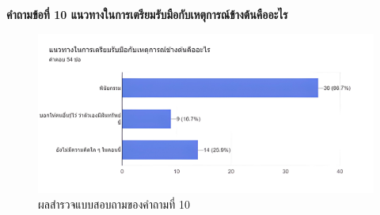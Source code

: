 \documentclass[12pt,oneside,openright,a4paper]{cpe-thai-project}
\begin{document}
\bf คำถามข้อที่ 10 แนวทางในการเตรียมรับมือกับเหตุการณ์ข้างต้นคืออะไร\\
\begin{figure}[h]
			\centering
			\includegraphics[scale=0.1]{apprex10}
			\caption{ผลสำรวจแบบสอบถามของคำถามที่ 10}
		\end{figure}
\FloatBarrier



\end{document}
